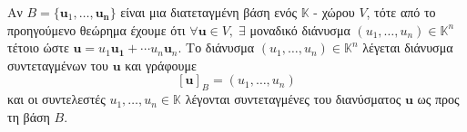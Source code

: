 \begin{rem}
    Αν $B = \{ \mathbf{u}_{1}, \ldots, \mathbf{u_{n}} \} $ είναι μια διατεταγμένη 
    βάση ενός $ \mathbb{K} $ - χώρου $V$, τότε από το προηγούμενο θεώρημα έχουμε ότι 
    $ \forall \mathbf{u} \in V, \; \exists $ μοναδικό διάνυσμα 
    $ (u_{1}, \ldots, u_{n}) \in \mathbb{K}^{n} $ τέτοιο ώστε 
    $ \mathbf{u} = u_{1} \mathbf{u_{1}} + \cdots u_{n} \mathbf{u}_{n} $. 
    Το διάνυσμα $ (u_{1}, \ldots, u_{n}) \in \mathbb{K}^{n} $ λέγεται 
    \textcolor{Col2}{διάνυσμα συντεταγμένων} του $ \mathbf{u} $ και γράφουμε 
    \[ 
        [\mathbf{u}]_{B} = (u_{1}, \ldots, u_{n})
    \] 
    και  
    οι συντελεστές $ u_{1}, \ldots, u_{n} \in \mathbb{K} $ λέγονται 
    \textcolor{Col2}{συντεταγμένες} του διανύσματος $ \mathbf{u} $ ως προς τη βάση $B$.
\end{rem}

